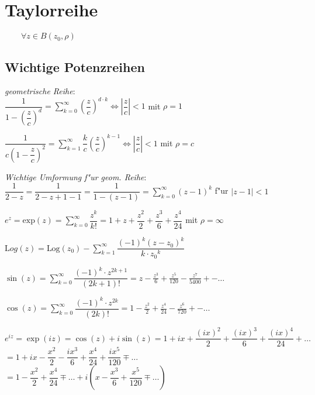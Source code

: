 \section{Taylorreihe}
\(\qquad \forall z \in B(z_0, \rho)\)

\subsection{Wichtige Potenzreihen}
\emph{geometrische Reihe}:\\
$\displaystyle \dfrac{1}{1-\left(\dfrac{z}{c}\right)^d} = \sum_{k=0}^\infty \left(\dfrac{z}{c}\right)^{d \cdot k}
\Longleftrightarrow \left\vert\dfrac{z}{c}\right\vert<1$ \qquad mit \(\rho = 1\)

$\displaystyle \dfrac{1}{c\left(1-\dfrac{z}{c}\right)^2} = \sum_{k=1}^\infty \dfrac{k}{c}\left(\dfrac{z}{c}\right)^{k-1}
\Longleftrightarrow \left\vert\dfrac{z}{c}\right\vert<1$ \qquad mit \(\rho = c\)

\emph{Wichtige Umformung f"ur geom. Reihe}:\\
\(\dfrac{1}{2-z} = \dfrac{1}{2-z+1-1}=\dfrac{1}{1-(z-1)} = \sum\limits_{k=0}^\infty (z-1)^k\) f"ur \(\vert z-1\vert < 1\) 

$\displaystyle e^z = \text{exp}(z) = \sum_{k=0}^\infty \dfrac{z^k}{k!} =
1 + z + \dfrac{z^2}{2} + \dfrac{z^3}{6} + \dfrac{z^4}{24}$ \qquad mit \(\rho = \infty\)

$\displaystyle \text{L}og(z) = \text{Log}(z_0) - \sum_{k=1}^\infty \dfrac{(-1)^k(z-z_0)^k}{k\cdot {z_0}^k}$

$\displaystyle \sin(z) = \sum_{k=0}^\infty \dfrac{(-1)^k \cdot z^{2k+1}}{(2k+1)!} = 
z - \frac{z^3}{6} + \frac{z^5}{120} - \frac{z^7}{5400} +- \dots$

$\displaystyle \cos(z) = \sum_{k=0}^\infty \dfrac{(-1)^k \cdot z^{2k}}{(2k)!} =
1 - \frac{z^2}{2} + \frac{z^4}{24} - \frac{z^6}{720} +- \dots$

\(e^{iz} = \exp(iz) = \cos(z) + i\sin(z) = 1 + ix + \dfrac{(ix)^2}{2} + \dfrac{(ix)^3}{6} + \dfrac{(ix)^4}{24} + \dots\)\\
\hspace*{4mm} \(= 1 + ix - \dfrac{x^2}{2} - \dfrac{ix^3}{6} + \dfrac{x^4}{24} + \dfrac{ix^5}{120} \mp \dots\)\\
\hspace*{4mm} \(= 1 - \dfrac{x^2}{2} + \dfrac{x^4}{24} \mp \dots + i\left(x - \dfrac{x^3}{6} + \dfrac{x^5}{120} \mp \dots \right)\)


